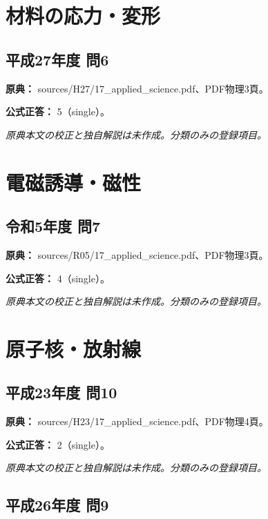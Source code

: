 \section{材料の応力・変形}

\subsection{平成27年度 問6}
\label{q:h27-reg-applied-06}

\noindent\textbf{原典：} sources/H27/17\_applied\_science.pdf、PDF物理3頁。

\textbf{公式正答：} 5（single）。

\par\textit{原典本文の校正と独自解説は未作成。分類のみの登録項目。}

\section{電磁誘導・磁性}

\subsection{令和5年度 問7}
\label{q:r05-reg-applied-07}

\noindent\textbf{原典：} sources/R05/17\_applied\_science.pdf、PDF物理3頁。

\textbf{公式正答：} 4（single）。

\par\textit{原典本文の校正と独自解説は未作成。分類のみの登録項目。}

\section{原子核・放射線}

\subsection{平成23年度 問10}
\label{q:h23-reg-applied-10}

\noindent\textbf{原典：} sources/H23/17\_applied\_science.pdf、PDF物理4頁。

\textbf{公式正答：} 2（single）。

\par\textit{原典本文の校正と独自解説は未作成。分類のみの登録項目。}

\subsection{平成26年度 問9}
\label{q:h26-reg-applied-09}

